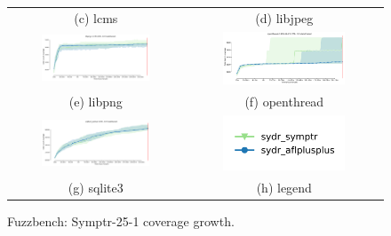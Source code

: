 \begin{figure}[t]
{\begin{tabular}{cc}
            (c) lcms                                                                                                 & (d) libjpeg                                                                                                    \\[6pt]
            \includegraphics[width=0.65\textwidth]{assets/fuzzbench/symptr-25-1/libpng-1.2.56_coverage_growth.png}   & \includegraphics[width=0.65\textwidth]{assets/fuzzbench/symptr-25-1/openthread-2019-12-23_coverage_growth.png} \\
            (e) libpng                                                                                               & (f) openthread                                                                                                 \\[6pt]
            \includegraphics[width=0.65\textwidth]{assets/fuzzbench/symptr-25-1/sqlite3_ossfuzz_coverage_growth.png} & \includegraphics[width=0.65\textwidth]{assets/fuzzbench/symptr-25-1/fuzzbench-legend.png}                      \\
            (g) sqlite3                                                                                              & (h) legend                                                                                                     \\[6pt]
        \end{tabular}
    }
    \caption{Fuzzbench: Symptr-25-1 coverage growth.}
    \label{fig:fuzzbench:symptr-25-1}
\end{figure}

